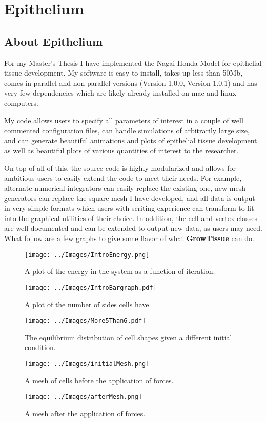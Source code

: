 \chapter{Epithelium}
\section{About Epithelium}
For my Master's Thesis I have implemented the Nagai-Honda Model for epithelial tissue development. My software is easy to install, takes up less than 50Mb, comes in parallel and non-parallel versions (Version 1.0.0, Version 1.0.1) and has very few dependencies which are likely already installed on mac and linux computers. 

My code allows users to specify all parameters of interest in a couple of well commented configuration files, can handle simulations of arbitrarily large size, and can generate beautiful animations and plots of epithelial tissue development as well as beautiful plots of various quantities of interest to the researcher. 

On top of all of this, the source code is highly modularized and allows for ambitious users to easily extend the code to meet their needs. For example, alternate numerical integrators can easily replace the existing one, new mesh generators can replace the square mesh I have developed, and all data is output in very simple formats which users with scriting experience can transform to fit into the graphical utilities of their choice. In addition, the cell and vertex classes are well documented and can be extended to output new data, as users may need. What follow are a few graphs to give some flavor of what \textbf{GrowTissue} can do.

\begin{figure}[h]
\centering
\texttt{[image: ../Images/IntroEnergy.png]}
\caption{A plot of the energy in the system as a function of iteration.}
\end{figure}

\begin{figure}[h]
\centering
\texttt{[image: ../Images/IntroBargraph.pdf]}
\caption{A plot of the number of sides cells have.}
\end{figure}

\begin{figure}[h]
\centering
\texttt{[image: ../Images/More5Than6.pdf]}
\caption{The equilibrium distribution of cell shapes given a different initial condition.}
\end{figure}

\begin{figure}[h]
\centering
\texttt{[image: ../Images/initialMesh.png]}
\caption{A mesh of cells before the application of forces.}
\end{figure}

\begin{figure}[h]
\centering
\texttt{[image: ../Images/afterMesh.png]}
\caption{A mesh after the application of forces.}
\end{figure}
